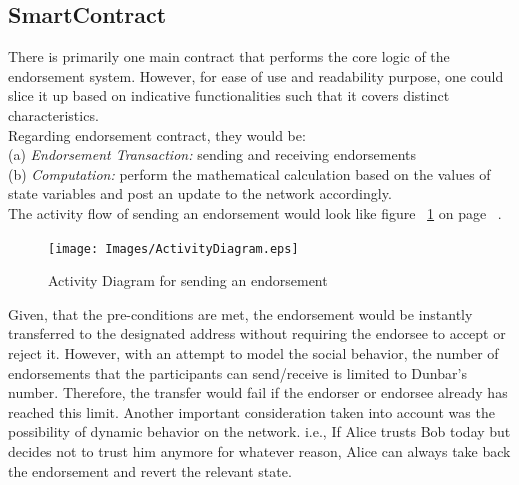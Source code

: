 \subsection{SmartContract} 
There is primarily one main contract that performs the core logic of the
endorsement system. However, for ease of use and readability purpose, one could
slice it up based on indicative functionalities such that it covers distinct
characteristics. \\

Regarding endorsement contract, they would be: \\
(a) \textit{Endorsement Transaction:} sending and receiving endorsements \\
(b) \textit{Computation:} perform the mathematical calculation based on the values of
state variables and post an update to the network accordingly. \\

The activity flow of sending an endorsement would look like figure
~\ref{fig:activity} on page ~\pageref{fig:activity}.

\begin{figure}
	\centering
	\texttt{[image: Images/ActivityDiagram.eps]}
	\caption{Activity Diagram for sending an endorsement}
	\label{fig:activity}
\end{figure}
Given, that the pre-conditions are met, the endorsement would be instantly
transferred to the designated address without requiring the endorsee to accept
or reject it. However, with an attempt to model the social behavior, the number
of endorsements that the participants can send/receive is limited to Dunbar's
number\cite{hill2003social}. Therefore, the transfer would fail if the endorser
or endorsee already has reached this limit. Another important consideration
taken into account was the possibility of dynamic behavior on the network.
i.e., If Alice trusts Bob today but decides not to trust him anymore for
whatever reason, Alice can always take back the endorsement and revert the
relevant state.  




